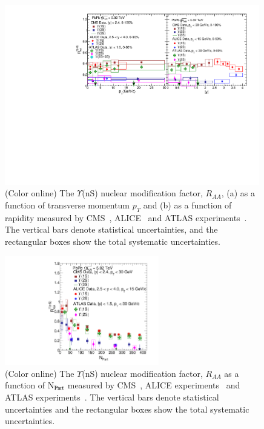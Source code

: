 \begin{figure}
  \includegraphics[width=0.99\textwidth]{Figures/ExpOverview/Fig_LHC_YnSRAAPtRap.pdf}
  \caption{(Color online) The $\Upsilon$(nS) nuclear modification factor, $R_{AA}$, (a) as a function of transverse momentum $p_{T}$
    and (b) as a function of rapidity measured by CMS~\cite{CMS:2018zza}, ALICE~\cite{ALICE:2020wwx}
    and ATLAS experiments~\cite{ALICE:2020wwx}.
    The vertical bars denote statistical uncertainties, and the rectangular boxes show the total systematic uncertainties.
  }
  \label{fig:LHCYnSRAAPtRap}
\end{figure}


\begin{figure}
  \begin{center}
  \includegraphics[width=0.6\textwidth]{Figures/ExpOverview/Fig_LHC_YnSRAANPart.pdf}
  \caption{(Color online) The $\Upsilon$(nS) nuclear modification factor, $R_{AA}$ as a function of N$_{\rm Part}$
    measured by CMS~\cite{CMS:2018zza}, ALICE experiments~\cite{ALICE:2020wwx} and ATLAS experiments~\cite{ALICE:2020wwx}.
    The vertical bars denote statistical uncertainties and the rectangular boxes show the total systematic uncertainties.
  }
  \label{fig:LHCYnSRAANPart}
  \end{center}
\end{figure}



